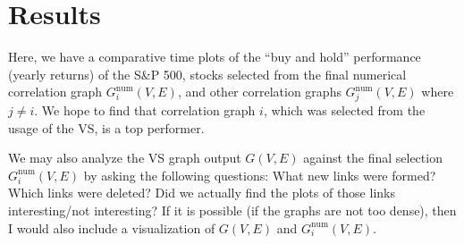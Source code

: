 \section{Results}
\label{sec:usage:results}

Here, we have a comparative time plots of the ``buy and hold'' performance 
(yearly returns) of the S\&P 500, stocks selected from the final numerical 
correlation graph $G_i^{\text{num}}(V,E)$, and other correlation graphs 
$G_j^{\text{num}}(V,E)$ where $j\neq i$. We hope to find that correlation graph 
$i$, which was selected from the usage of the VS, is a top performer.

We may also analyze the VS graph output $G(V,E)$ against the final selection 
$G_i^{\text{num}}(V,E)$ by asking the following questions: What new links were 
formed? Which links were deleted? Did we actually find the
plots of those links interesting/not interesting? If it is possible (if the 
graphs are not too dense), then I would also include a visualization of 
$G(V,E)$ and $G_i^{\text{num}}(V,E)$.
